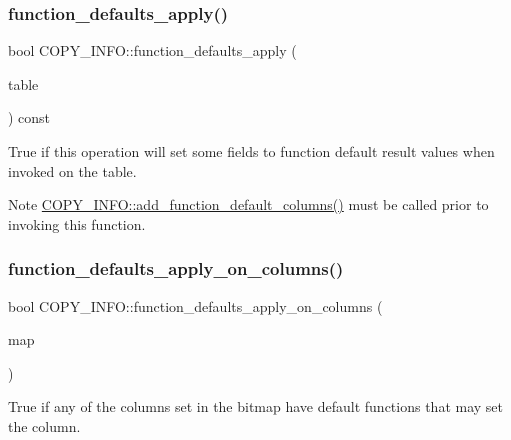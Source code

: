 \subsubsection{\texorpdfstring{function\+\_\+defaults\+\_\+apply()}{function\_defaults\_apply()}}
{\footnotesize\ttfamily bool C\+O\+P\+Y\+\_\+\+I\+N\+F\+O\+::function\+\_\+defaults\+\_\+apply (\begin{DoxyParamCaption}\item[{const \mbox{\hyperlink{structTABLE}{T\+A\+B\+LE}} $\ast$}]{table }\end{DoxyParamCaption}) const\hspace{0.3cm}{\ttfamily [inline]}}

True if this operation will set some fields to function default result values when invoked on the table.

\begin{DoxyNote}{Note}
\mbox{\hyperlink{classCOPY__INFO_ae3d8192214b05dc110801ec8dd999edc}{C\+O\+P\+Y\+\_\+\+I\+N\+F\+O\+::add\+\_\+function\+\_\+default\+\_\+columns()}} must be called prior to invoking this function. 
\end{DoxyNote}
\mbox{\label{classCOPY__INFO_af9bd54cdb4f21814f6575129550313aa}} 
\subsubsection{\texorpdfstring{function\+\_\+defaults\+\_\+apply\+\_\+on\+\_\+columns()}{function\_defaults\_apply\_on\_columns()}}
{\footnotesize\ttfamily bool C\+O\+P\+Y\+\_\+\+I\+N\+F\+O\+::function\+\_\+defaults\+\_\+apply\+\_\+on\+\_\+columns (\begin{DoxyParamCaption}\item[{M\+Y\+\_\+\+B\+I\+T\+M\+AP $\ast$}]{map }\end{DoxyParamCaption})\hspace{0.3cm}{\ttfamily [inline]}}

True if any of the columns set in the bitmap have default functions that may set the column. \mbox{\label{classCOPY__INFO_a514b233a8aca96ba77cb73459a112b77}} 
